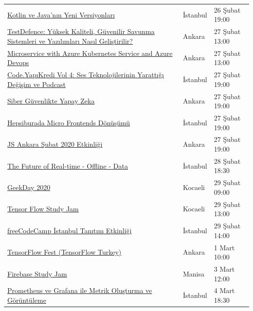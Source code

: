 \documentclass[11pt]{article}
\begin{document}
\begin{longtable}{|p{8cm}|l|l|}
\href{https://www.meetup.com/Sahibinden-D2D-Events/events/268634768/}{Kotlin ve Java'nın Yeni Versiyonları} & İstanbul & 26 Şubat 19:00\\
\href{https://www.eventbrite.com/e/testdefence-yuksek-kaliteli-guvenilir-savunma-sistemleri-ve-yazlmlar-nasl-gelistirilir-tickets-88086646531}{TestDefence: Yüksek Kaliteli, Güvenilir Savunma Sistemleri ve Yazılımları Nasıl Geliştirilir?} & Ankara & 27 Şubat 13:00\\
\href{https://www.meetup.com/Microsoft-Giri\%25C5\%259Fimcilik-Bulu\%25C5\%259Fmalar\%25C4\%25B1/events/268504693/}{Microservice with Azure Kubernetes Service and Azure Devops} & Ankara & 27 Şubat 13:00\\
\href{https://www.eventbrite.com/e/codeyapkredi-vol-4-ses-teknolojilerinin-yarattg-degisim-ve-podcast-tickets-94125416655}{Code.YapıKredi Vol 4: Ses Teknolojilerinin Yarattığı Değişim ve Podcast} & İstanbul & 27 Şubat 19:00\\
\href{https://www.eventbrite.com/e/siber-guvenlikte-yapay-zeka-tickets-92908165825}{Siber Güvenlikte Yapay Zeka} & Ankara & 27 Şubat 19:00\\
\href{https://www.meetup.com/Hepsitech-Meetup/events/268530407/}{Hepsiburada Micro Frontends Dönüşümü} & İstanbul & 27 Şubat 19:00\\
\href{https://www.meetup.com/Javascript-Ankara/events/268677048/}{JS Ankara Şubat 2020 Etkinliği} & Ankara & 27 Şubat 19:00\\
\href{https://kommunity.com/cloud-and-serverless-turkey/events/the-future-of-real-time-offline-data-istanbul}{The Future of Real-time - Offline - Data} & İstanbul & 28 Şubat 18:30\\
\href{https://www.eventbrite.com/e/geekday-2020-tickets-93463962227}{GeekDay 2020} & Kocaeli & 29 Şubat 09:00\\
\href{https://www.meetup.com/GDGKocaeli/events/268678688/}{Tensor Flow Study Jam} & Kocaeli & 29 Şubat 13:00\\
\href{https://kommunity.com/freecodecamp-istanbul/events/freecodecamp-istanbul-tanitim-etkinligi}{freeCodeCamp İstanbul Tanıtım Etkinliği} & İstanbul & 29 Şubat 14:00\\
\href{https://kommunity.com/bilge-adam-teknoloji/events/tensorflow}{TensorFlow Fest (TensorFlow Turkey)} & Ankara & 1 Mart 10:00\\
\href{https://www.meetup.com/GDG-Manisa/events/268736708/}{Firebase Study Jam} & Manisa & 3 Mart 12:00\\
\href{https://kommunity.com/devops-turkiye/events/prometheus-ve-grafana-ile-metrik-olusturma-ve-goruntuleme}{Prometheus ve Grafana ile Metrik Oluşturma ve Görüntüleme} & İstanbul & 4 Mart 18:30\\

\end{longtable}
\end{document}
